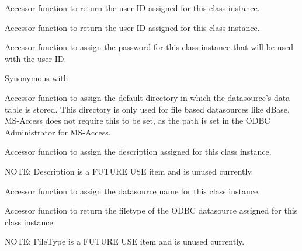 
Accessor function to return the user ID assigned for this class
instance.

\label{wxdbconnectinfgetuserid}


Accessor function to return the user ID assigned for this class
instance.

\label{wxdbconnectinfsetauthstr}


Accessor function to assign the password for this class
instance that will be used with the user ID.

Synonymous with 

\label{wxdbconnectinfsetdefaultdir}


Accessor function to assign the default directory in which the datasource's data
table is stored.  This directory is only used for file based datasources like
dBase.  MS-Access does not require this to be set, as the path is set in the
ODBC Administrator for MS-Access.

\label{wxdbconnectinfsetdescription}


Accessor function to assign the description assigned for this class
instance.

NOTE: Description is a FUTURE USE item and is unused currently.

\label{wxdbconnectinfsetdsn}


Accessor function to assign the datasource name for this class instance.

\label{wxdbconnectinfsetfiletype}


Accessor function to return the filetype of the ODBC datasource assigned for
this class instance.

NOTE: FileType is a FUTURE USE item and is unused currently.

